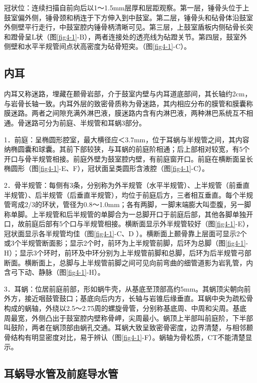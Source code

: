 冠状位：连续扫描自前向后以1～1.5mm层厚和层距观察。第一层，锤骨头位于上鼓室偏外侧，锤骨颈和柄连于下方伸入到中鼓室。第二层，锤骨头和砧骨体沿鼓室外侧壁平行走行，中鼓室腔内锤骨柄清晰可见。第三层，上鼓室盾板内侧砧骨长突和蹬骨呈L状（图\ref{fig4-1}-B），两者连接处的透亮线为砧蹬关节。第四层，鼓室外侧壁和水平半规管间点状高密度为砧骨短突。（图\ref{fig4-1}-C）。

\subsection{内耳}

内耳又称迷路，埋藏在颞骨岩部，介于鼓室内壁与内耳道底部间，其长轴约2cm，与岩骨长轴一致。内耳外层的致密骨质称为骨迷路，其内相应分布的膜管和膜囊称膜迷路。两者之间隙充满外淋巴液，膜迷路内含有内淋巴液，两种淋巴系统互不相通。骨迷路可分为前庭、半规管和耳蜗3部分。

1．前庭：呈椭圆形腔室，最大横径应＜3.7mm，位于耳蜗与半规管之间，其内容纳椭圆囊和球囊。其前下部较狭，与耳蜗的前庭阶相通；后上部相对较宽，有5个开口与骨半规管相接。前庭外壁为鼓室腔内壁，有前庭窗开口。前庭在横断面呈长椭圆形（图\ref{fig4-1}-E、F），冠状面呈类圆形含液腔（图\ref{fig4-1}-C）。

2．骨半规管：每侧有3条，分别称为外半规管（水平半规管）、上半规管（前垂直半规管）、后半规管（后垂直半规管），均位于前庭后方，三者相互垂直。每个半规管弯成2/3的环状，管径为0.8～1.0mm；各有两脚，一脚末端膨大叫壶腹，另一脚称单脚。上半规管和后半规管的单脚合为一总脚开口于前庭后部，其他各脚单独开口，故前庭后部有5个口与半规管相接。横断面显示外半规管较好（图\ref{fig4-1}-E），冠状面显示各半规管均佳（图\ref{fig4-1}-C、D
）。横断面上颞骨靠上层面可显示2个或3个半规管断面影；显示2个时，前环为上半规管前脚，后环为总脚（图\ref{fig4-1}-H）；显示3个环时，前环及中环分别为上半规管前脚和总脚，后环为后半规管弓部断面。横断面上，总脚与上半规管前脚之间可见向前弯曲的细管道影为岩乳管，内含弓下动、静脉（图\ref{fig4-1}-H）。

3．耳蜗：位居前庭前部，形如蜗牛壳，从基底至顶部高约5mm。其蜗顶尖朝向前外方，接近咽鼓管鼓口；基底向后内方，长轴与岩锥后缘垂直。耳蜗中央为疏松骨构成的蜗轴，外绕以2.5～2.75周的螺旋骨管，分别称基底周、中周和尖周。基底周最宽，外侧凸出于鼓室腔内壁称骨岬，尖周最小。蜗顶上半部叫前庭阶，下半部叫鼓阶，两者在蜗顶部由蜗孔交通。耳蜗大致呈致密骨密度，边界清楚，与相邻颞骨结构有明显密度对比，易于辨认（图\ref{fig4-1}-F）。蜗轴为骨松质，CT不能清楚显示。

\subsection{耳蜗导水管及前庭导水管}

